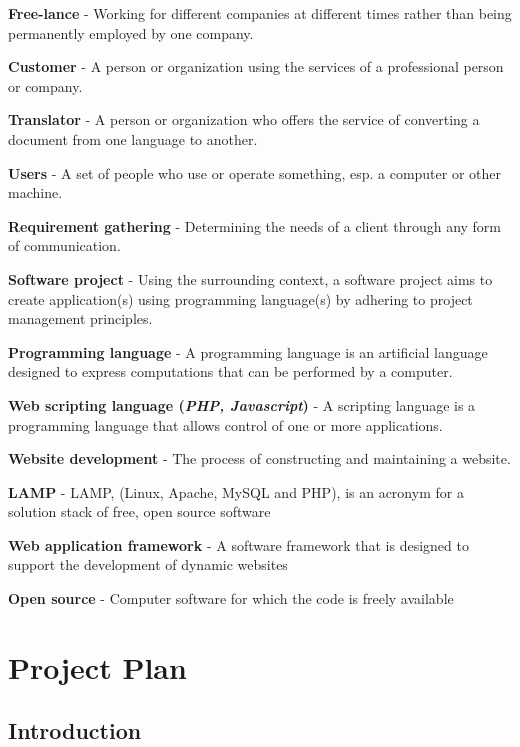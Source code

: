 \documentclass{l3proj}
\begin{document}
\begin{itemize}
\small{
\item{\textbf{Free-lance} - Working for different companies at different times rather than being permanently employed by one company.} 
\item{\textbf{Customer} - A person or organization using the services of a professional person or company.}
\item{\textbf{Translator} - A person or organization who offers the service of converting a document from one language to another.}
\item{\textbf{Users} - A set of people who use or operate something, esp. a computer or other machine.}
\item{\textbf{Requirement gathering} - Determining the needs of a client through any form of communication.}
\item{\textbf{Software project} - Using the surrounding context, a software project aims to create application(s) using programming language(s) by adhering to project management principles.}
\item{\textbf{Programming language} - A programming language is an artificial language designed to express computations that can be performed by a computer.}
\item{\textbf{Web scripting language (\textit{PHP, Javascript})} - A scripting language is a programming language that allows control of one or more applications.}
\item{\textbf{Website development} - The process of constructing and maintaining a website.}
\item{\textbf{LAMP} - LAMP, (Linux, Apache, MySQL and PHP), is an acronym for a solution stack of free, open source software}
\item{\textbf{Web application framework} - A software framework that is designed to support the development of dynamic websites }
\item{\textbf{Open source} - Computer software for which the code is freely available }
}
\end{itemize}
\chapter{Project Plan}
\label{chap:proj-plan}
\section{Introduction}
\label{sect:pp-intro}
\end{document}
